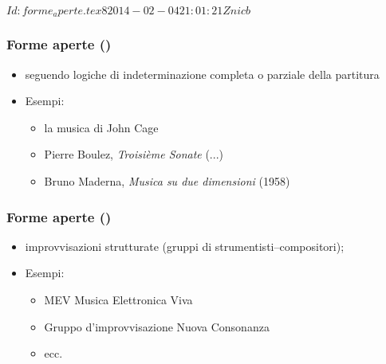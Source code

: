 %
%
\svnInfo $Id: forme_aperte.tex 8 2014-02-04 21:01:21Z nicb $

\setcounter{ms}{0}
\begin{frame}
    \frametitle{Forme aperte ()}

    \begin{itemize}

        \item seguendo logiche di indeterminazione completa o parziale della partitura

        \item Esempi:

            \begin{itemize}

                \item la musica di John Cage

                \item Pierre Boulez, \emph{Troisi\`eme Sonate} (...)

                \item Bruno Maderna, \emph{Musica su due dimensioni} (1958)

            \end{itemize}

    \end{itemize}

\end{frame}

\begin{frame}
    \frametitle{Forme aperte ()}

    \begin{itemize}

        \item improvvisazioni strutturate (gruppi di strumentisti--compositori);

        \item Esempi:

            \begin{itemize}

                \item MEV Musica Elettronica Viva

                \item Gruppo d'improvvisazione Nuova Consonanza

                \item ecc.

            \end{itemize}

    \end{itemize}

\end{frame}
